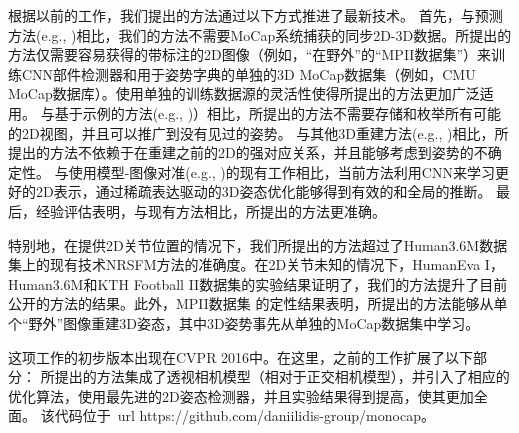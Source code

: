根据以前的工作，我们提出的方法通过以下方式推进了最新技术。
首先，与预测方法(e.g., \cite{li2015maximum,tekin2015predicting})相比，我们的方法不需要MoCap系统捕获的同步2D-3D数据。所提出的方法仅需要容易获得的带标注的2D图像（例如，“在野外”的“MPII数据集”\cite{andriluka14cvpr}）来训练CNN部件检测器和用于姿势字典的单独的3D MoCap数据集（例如，CMU MoCap数据库）。使用单独的训练数据源的灵活性使得所提出的方法更加广泛适用。
与基于示例的方法(e.g., \cite{jiang20103d,yasin2016dual})）相比，所提出的方法不需要存储和枚举所有可能的2D视图，并且可以推广到没有见过的姿势。
与其他3D重建方法(e.g., \cite{jiang20103d,yasin2016dual})相比，所提出的方法不依赖于在重建之前的2D的强对应关系，并且能够考虑到姿势的不确定性。
与使用模型-图像对准(e.g., \cite{guan2009estimating,sigal2012loose,bogo2016keep})的现有工作相比，当前方法利用CNN来学习更好的2D表示，通过稀疏表达驱动的3D姿态优化能够得到有效的和全局的推断。
最后，经验评估表明，与现有方法相比，所提出的方法更准确。


特别地，在提供2D关节位置的情况下，我们所提出的方法超过了Human3.6M数据集\cite{ionescu2014human}上的现有技术NRSFM方法\cite{dai2012simple}的准确度。在2D关节未知的情况下，HumanEva I\cite{sigal2010humaneva}，Human3.6M\cite{ionescu2014human}和KTH Football II数据集\cite{kazemi2013multi}的实验结果证明了，我们的方法提升了目前公开的方法的结果。此外，MPII数据集 \cite{andriluka14cvpr} 的定性结果表明，所提出的方法能够从单个“野外”图像重建3D姿态，其中3D姿势事先从单独的MoCap数据集中学习。

这项工作的初步版本出现在CVPR 2016\cite{zhou2016sparseness}中。在这里，之前的工作扩展了以下部分：
所提出的方法集成了透视相机模型（相对于正交相机模型），并引入了相应的优化算法，使用最先进的2D姿态检测器，并且实验结果得到提高，使其更加全面。
该代码位于\ url {https://github.com/daniilidis-group/monocap}。


